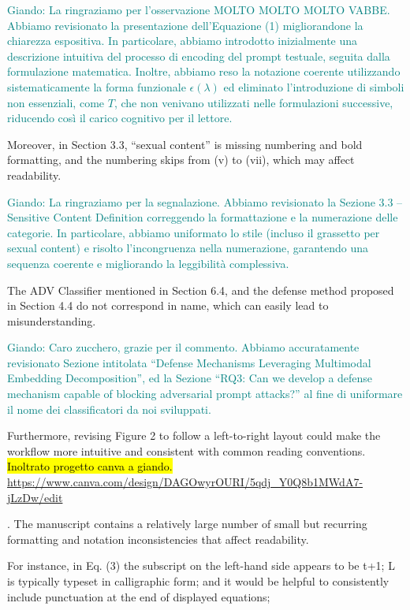 \documentclass{ar2rc}
\newcommand{\virgolette}[1]{``#1''}
\newcommand{\virgolette}[1]{``#1''}
\newcommand{\giando}[1]{\textcolor{teal}{Giando: #1}}
\begin{document}
    \AC \giando{La ringraziamo per l’osservazione MOLTO MOLTO MOLTO VABBE. Abbiamo revisionato la presentazione dell’Equazione (1) migliorandone la chiarezza espositiva. In particolare, abbiamo introdotto inizialmente una descrizione intuitiva del processo di encoding del prompt testuale, seguita dalla formulazione matematica. Inoltre, abbiamo reso la notazione coerente utilizzando sistematicamente la forma funzionale $\epsilon(\lambda)$ ed eliminato l’introduzione di simboli non essenziali, come $T$, che non venivano utilizzati nelle formulazioni successive, riducendo così il carico cognitivo per il lettore.}
    
    \RC Moreover, in Section 3.3, “sexual content” is missing numbering and bold formatting, and the numbering skips from (v) to (vii), which may affect readability. 

    \AC \giando{La ringraziamo per la segnalazione. Abbiamo revisionato la Sezione 3.3 – Sensitive Content Definition correggendo la formattazione e la numerazione delle categorie. In particolare, abbiamo uniformato lo stile (incluso il grassetto per sexual content) e risolto l’incongruenza nella numerazione, garantendo una sequenza coerente e migliorando la leggibilità complessiva.}

    \RC The ADV Classifier mentioned in Section 6.4, and the defense method proposed in Section 4.4 do not correspond in name, which can easily lead to misunderstanding. 

    \AC \giando{Caro zucchero, grazie per il commento. Abbiamo accuratamente revisionato Sezione intitolata \virgolette{Defense Mechanisms Leveraging Multimodal Embedding Decomposition}, ed la Sezione \virgolette{RQ3: Can we develop a defense mechanism capable of blocking adversarial prompt attacks?} al fine di uniformare il nome dei classificatori da noi sviluppati.}

    \RC Furthermore, revising Figure 2 to follow a left-to-right layout could make the workflow more intuitive and consistent with common reading conventions.
    \hl{Inoltrato progetto canva a giando. }
\href{https://www.canva.com/design/DAGOwyrOURI/5qdj_Y0Q8b1MWdA7-jLzDw/edit}{https://www.canva.com/design/DAGOwyrOURI/5qdj_Y0Q8b1MWdA7-jLzDw/edit}
    
    . The manuscript contains a relatively large number of small but recurring formatting and notation inconsistencies that affect readability. 
    
    \AC For instance, in Eq. (3) the subscript on the left-hand side appears to be t+1; L is typically typeset in calligraphic form; and it would be helpful to consistently include punctuation at the end of displayed equations; 
\end{document}
